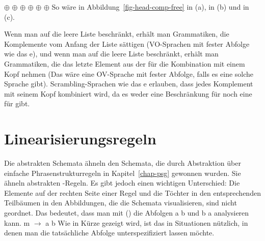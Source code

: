 \eal
\ex \eliste{} $\oplus$  $\oplus$  
\ex {} $\oplus$  $\oplus$  
\ex {} $\oplus$  $\oplus$ \eliste 
\zl
So wäre  in Abbildung~\ref{fig-head-comp-free} \npnom{} in (a), \npdat{} in (b) und \npacc{} in (c).

Wenn man  auf die
leere Liste beschränkt, erhält man Grammatiken, die Komplemente vom Anfang der Liste sättigen (VO-Sprachen
mit fester Abfolge wie das e), und wenn man  auf die leere Liste beschränkt, erhält man Grammatiken, die das letzte
Element aus der \compsl für die Kombination mit einem Kopf nehmen (Das wäre eine OV-Sprache mit fester
Abfolge, falls es eine solche Sprache gibt). Scrambling-Sprachen wie das e erlauben, dass jedes
Komplement mit seinem Kopf kombiniert wird, da es weder eine Beschränkung für  noch eine für  gibt.%

\section{Linearisierungsregeln}
\label{sec-lp-rules}

Die abstrakten Schemata ähneln den Schemata, die durch Abstraktion über einfache Phrasenstrukturregeln in Kapitel~\ref{chap-psg} gewonnen wurden. Sie ähneln abstrakten \xbar-Regeln. Es gibt jedoch
einen wichtigen Unterschied: Die Elemente auf der rechten Seite einer Regel und die Töchter in den
entsprechenden Teilbäumen in den Abbildungen, die die Schemata visualisieren, sind nicht geordnet. 
Das bedeutet, dass man mit () die Abfolgen a b und b a analysieren kann.
\ea
m $\to$ a b
\z
Wie in Kürze gezeigt wird, ist das in Situationen nützlich, in denen man die tatsächliche
Abfolge unterspezifiziert lassen möchte.

